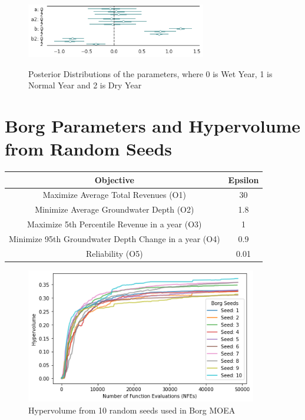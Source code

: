 \documentclass[11pt,a4paper]{article}
\begin{document}
\begin{figure}[H]
\centering
\includegraphics[width=0.7\textwidth]{gw_depth_response_posterior_2.png}
\label{fig:mesh1}
\caption{Posterior Distributions of the parameters, where 0 is Wet Year, 1 is Normal Year and 2 is Dry Year}
\end{figure}

\section{Borg Parameters and Hypervolume from Random Seeds}

\begin{center}
\begin{tabular}{ |c|c| }
 \hline
 Objective & Epsilon \\ 
 \hline
Maximize Average Total Revenues (O1) & 30  \\
Minimize Average Groundwater Depth (O2) & 1.8 \\
Maximize 5th Percentile Revenue in a year (O3) & 1 \\
Minimize 95th Groundwater Depth Change in a year (O4) & 0.9 \\
Reliability (O5) & 0.01 \\
\hline
\end{tabular}
\end{center}

\begin{figure}[H]
    \centering
    \includegraphics[width=0.9\textwidth]{Borg_Seeds_Hypervolume.png}
    \caption{Hypervolume from 10 random seeds used in Borg MOEA}
    \label{fig:m1esh1}
\end{figure}
\end{document}
